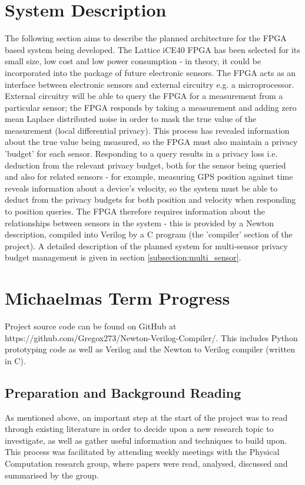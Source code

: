 \documentclass[pageno]{jpaper}
\begin{document}
\section{System Description}
The following section aims to describe the planned architecture for the FPGA based system being developed. The Lattice iCE40 FPGA has been selected for its small size, low cost and low power consumption - in theory, it could be incorporated into the package of future electronic sensors. The FPGA acts as an interface between electronic sensors and external circuitry e.g. a microprocessor. External circuitry will be able to query the FPGA for a measurement from a particular sensor; the FPGA responds by taking a measurement and adding zero mean Laplace distributed noise in order to mask the true value of the measurement (local differential privacy). This process has revealed information about the true value being measured, so the FPGA must also maintain a privacy 'budget' for each sensor. Responding to a query results in a privacy loss i.e. deduction from the relevant privacy budget, both for the sensor being queried and also for related sensors - for example, measuring GPS position against time reveals information about a device's velocity, so the system must be able to deduct from the privacy budgets for both position and velocity when responding to position queries. The FPGA therefore requires information about the relationships between sensors in the system - this is provided by a Newton description, compiled into Verilog by a C program (the 'compiler' section of the project). A detailed description of the planned system for multi-sensor privacy budget management is given in section \ref{subsection:multi_sensor}.

\section{Michaelmas Term Progress}
Project source code can be found on GitHub at https://github.com/Gregox273/Newton-Verilog-Compiler/. This includes Python prototyping code as well as Verilog and the Newton to Verilog compiler (written in C).

\subsection{Preparation and Background Reading}
As mentioned above, an important step at the start of the project was to read through existing literature in order to decide upon a new research topic to investigate, as well as gather useful information and techniques to build upon. This process was facilitated by attending weekly meetings with the Physical Computation\cite{physcomp} research group, where papers were read, analysed, discussed and summarised by the group.
\end{document}

